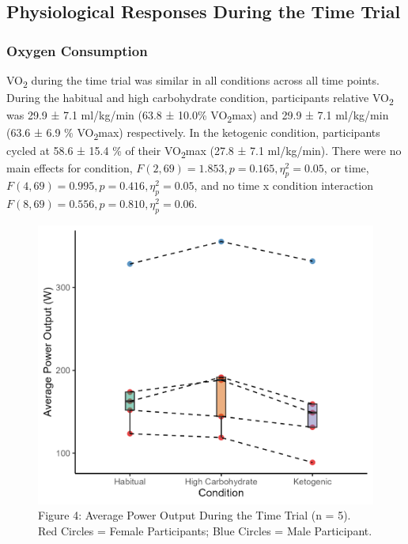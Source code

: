\documentclass[]{cik}%
\begin{document}
\hypertarget{physiological-responses-during-the-time-trial}{%
\subsection{Physiological Responses During the Time
Trial}\label{physiological-responses-during-the-time-trial}}

\hypertarget{oxygen-consumption}{%
\subsubsection{Oxygen Consumption}\label{oxygen-consumption}}

VO\textsubscript{2} during the time trial was similar in all conditions
across all time points. During the habitual and high carbohydrate
condition, participants relative VO\textsubscript{2} was 29.9 ± 7.1
ml/kg/min (63.8 ± 10.0\% VO\textsubscript{2}max) and 29.9 ± 7.1
ml/kg/min (63.6 ± 6.9 \% VO\textsubscript{2}max) respectively. In the
ketogenic condition, participants cycled at 58.6 ± 15.4 \% of their
VO\textsubscript{2}max (27.8 ± 7.1 ml/kg/min). There were no main
effects for condition, \(F(2, 69) = 1.853, p = 0.165, \eta^2_p = 0.05\),
or time, \(F(4, 69) = 0.995, p = 0.416, \eta^2_p = 0.05\), and no time x
condition interaction \(F(8, 69) = 0.556, p = 0.810, \eta^2_p = 0.06\).

\begin{figure}[H]
\includegraphics[width=1\linewidth]{figures/figure4} \caption{Figure 4: Average Power Output During the Time Trial (n = 5). Red Circles = Female Participants; Blue Circles = Male Participant.}\label{fig:fig4pdf}
\end{figure}
\end{document}
